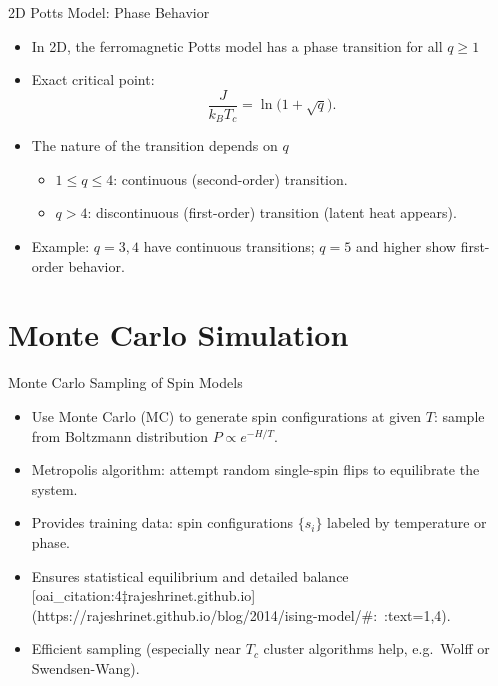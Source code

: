 \documentclass{beamer}
\begin{document}
\begin{frame}{2D Potts Model: Phase Behavior}
 \begin{itemize}
   \item In 2D, the ferromagnetic Potts model has a phase transition for all $q\ge1$ 
   \item Exact critical point:
     \[
       \frac{J}{k_B T_c} = \ln\!\bigl(1+\sqrt{q}\bigr).
     \]
   \item The nature of the transition depends on $q$ 
     \begin{itemize}
       \item $1 \le q \le 4$: continuous (second-order) transition.
       \item $q > 4$: discontinuous (first-order) transition (latent heat appears).
     \end{itemize}
   \item Example: $q=3,4$ have continuous transitions; $q=5$ and higher show first-order behavior.
 \end{itemize}
\end{frame}

\section{Monte Carlo Simulation}

\begin{frame}{Monte Carlo Sampling of Spin Models}
 \begin{itemize}
   \item Use Monte Carlo (MC) to generate spin configurations at given $T$:
     sample from Boltzmann distribution $P\propto e^{-H/T}$.
   \item Metropolis algorithm: attempt random single-spin flips to equilibrate the system.
   \item Provides training data: spin configurations $\{s_i\}$ labeled by temperature or phase.
   \item Ensures statistical equilibrium and detailed balance [oai_citation:4‡rajeshrinet.github.io](https://rajeshrinet.github.io/blog/2014/ising-model/#:~:text=1,4).
   \item Efficient sampling (especially near $T_c$ cluster algorithms help, e.g.\ Wolff or Swendsen-Wang).
 \end{itemize}
\end{frame}
\end{document}
